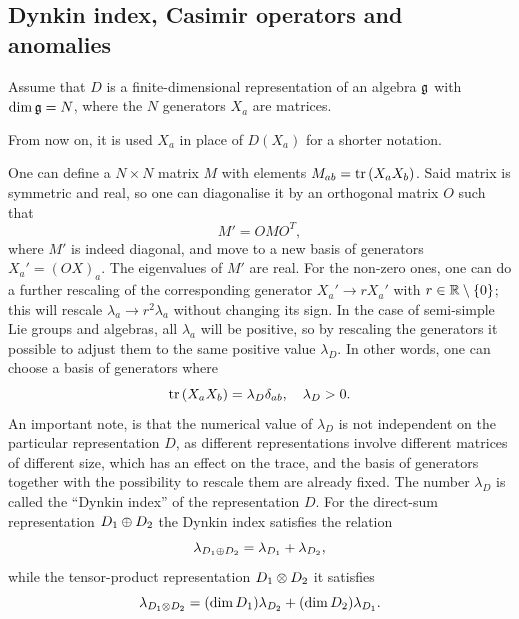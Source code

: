 \subsection{Dynkin index, Casimir operators and anomalies}
Assume that $D$ is a finite-dimensional representation of an algebra $\mathfrak{g}$ with $\dim{\mathfrak{g}} = N$, where the $N$ generators $X_a$ are matrices. 
\begin{notz}
    From now on, it is used $X_a$ in place of $D(X_a)$ for a shorter notation.
\end{notz}
One can define a $N \times N$ matrix $M$ with elements $M_{ab} = \mathrm{tr}\,{(X_aX_b)}$. Said matrix is symmetric and real, so one can diagonalise it by an orthogonal matrix $O$ such that 
\begin{equation}
    M' = OMO^T,
\end{equation}
where $M'$ is indeed diagonal, and move to a new basis of generators $X_a' = (OX)_a$. The eigenvalues of $M'$ are real. For the non-zero ones, one can do a further rescaling of the corresponding generator $X_a' \to rX_a'$ with $r \in \mathbb{R}\setminus\{0\}$; this will rescale $\lambda_a \to r^2\lambda_a$ without changing its sign. In the case of semi-simple Lie groups and algebras, all $\lambda_a$ will be positive, so by rescaling the generators it possible to adjust them to the same positive value $\lambda_D$. In other words, one can choose a basis of generators where
\begin{equation}
    \mathrm{tr}\,{(X_aX_b)} = \lambda_D\delta_{ab},\quad \lambda_D > 0.
\end{equation}
An important note, is that the numerical value of $\lambda_D$ is not independent on the particular representation $D$, as different representations involve different matrices of different size, which has an effect on the trace, and the basis of generators together with the possibility to rescale them are already fixed. The number $\lambda_D$ is called the ``Dynkin index'' of the representation $D$. For the direct-sum representation $D_1 \oplus D_2$ the Dynkin index satisfies the relation
\begin{equation}
\label{eq: Dynkin index of direct sum}
    \lambda_{D_1 \oplus D_2} = \lambda_{D_1} + \lambda_{D_2},
\end{equation}
while the tensor-product representation $D_1 \otimes D_2$ it satisfies
\begin{equation}
\label{eq: Dynkin index of tensor product}
    \lambda_{D_1 \otimes D_2} = (\dim{D_1})\lambda_{D_2} + (\dim{D_2})\lambda_{D_1}.
\end{equation}

